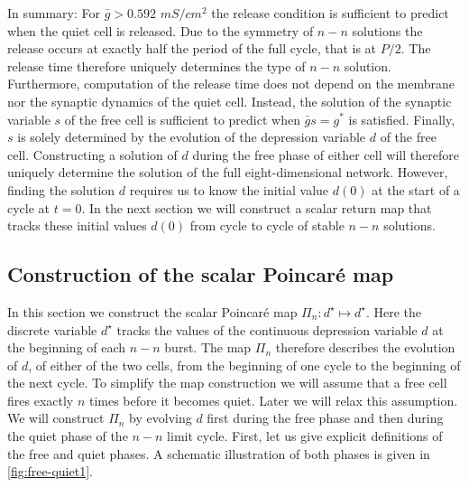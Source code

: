 \documentclass[utf8]{frontiersFPHY} %
\newcommand{\gbar}{\bar g}
\begin{document}
In summary: For $\gbar>0.592$ $\si{mS/cm^{2}}$ the release condition is sufficient to predict when the quiet cell is released.
Due to the symmetry of $n-n$ solutions the release occurs at exactly half the period of the full cycle, that is at $P/2$.
The release time therefore uniquely determines the type of $n-n$ solution.
Furthermore, computation of the release time does not depend on the membrane nor the synaptic dynamics of the quiet cell.
Instead, the solution of the synaptic variable $s$ of the free cell is sufficient to predict when $\gbar s=g^{*}$ is satisfied.
Finally, $s$ is solely determined by the evolution of the depression variable $d$ of the free cell.
Constructing a solution of $d$ during the free phase of either cell will therefore uniquely determine the solution of the full eight-dimensional network.
However, finding the solution $d$ requires us to know the initial value $d(0)$ at the start of a cycle at $t=0$.
In the next section we will construct a scalar return map that tracks these initial values $d(0)$ from cycle to cycle of stable $n-n$ solutions.

\subsection{Construction of the scalar Poincaré map}
In this section we construct the scalar Poincaré map $\Pi_{n}:d^{\star}\mapsto d^{\star}$.
Here the discrete variable $d^{\star}$ tracks the values of the continuous depression variable $d$ at the beginning of each $n-n$ burst.
The map $\Pi_{n}$ therefore describes the evolution of $d$, of either of the two cells, from the beginning of one cycle to the beginning of the next cycle.
To simplify the map construction we will assume that a free cell fires exactly $n$ times before it becomes quiet.
Later we will relax this assumption.
We will construct $\Pi_{n}$ by evolving $d$ first during the free phase and then during the quiet phase of the $n-n$ limit cycle.
First, let us give explicit definitions of the free and quiet phases.
A schematic illustration of both phases is given in \cref{fig:free-quiet1}.
\end{document}
